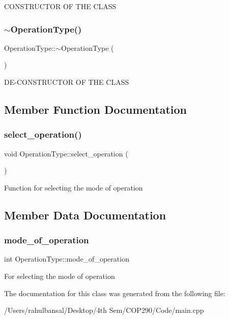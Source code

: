 C\+O\+N\+S\+T\+R\+U\+C\+T\+OR OF T\+HE C\+L\+A\+SS \mbox{\label{class_operation_type_a0f80a3d28608eff332fd53d2bcb74bf3}} 
\subsubsection{$\sim$\+Operation\+Type()}
{\footnotesize\ttfamily Operation\+Type\+::$\sim$\+Operation\+Type (\begin{DoxyParamCaption}{ }\end{DoxyParamCaption})}

D\+E-\/\+C\+O\+N\+S\+T\+R\+U\+C\+T\+OR OF T\+HE C\+L\+A\+SS 

\subsection{Member Function Documentation}
\mbox{\label{class_operation_type_a4d690c414b35052dc85162c6a1435a1f}} 
\subsubsection{select\+\_\+operation()}
{\footnotesize\ttfamily void Operation\+Type\+::select\+\_\+operation (\begin{DoxyParamCaption}{ }\end{DoxyParamCaption})\hspace{0.3cm}{\ttfamily [inline]}}

Function for selecting the mode of operation 

\subsection{Member Data Documentation}
\mbox{\label{class_operation_type_ae27b17a21183a62883850198ff106d15}} 
\subsubsection{mode\+\_\+of\+\_\+operation}
{\footnotesize\ttfamily int Operation\+Type\+::mode\+\_\+of\+\_\+operation}

For selecting the mode of operation 

The documentation for this class was generated from the following file\+:\begin{DoxyCompactItemize}
\item 
/\+Users/rahulbansal/\+Desktop/4th Sem/\+C\+O\+P290/\+Code/main.\+cpp\end{DoxyCompactItemize}
